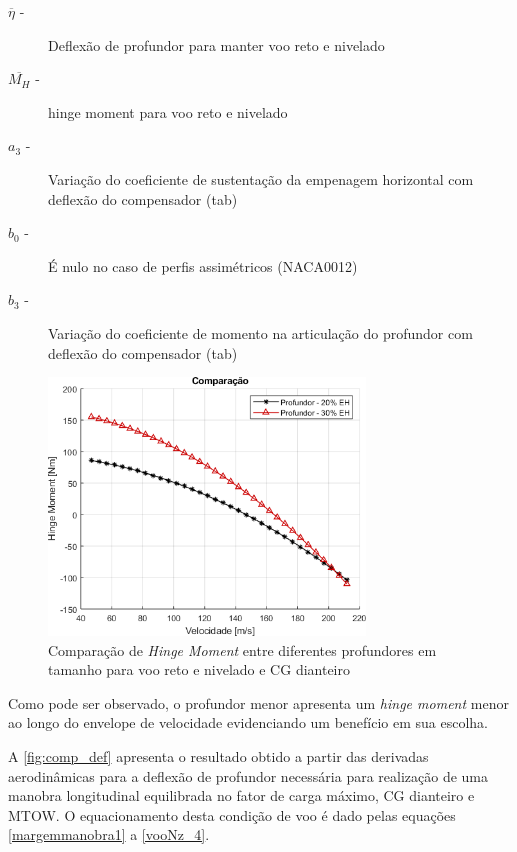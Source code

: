 \begin{description}
\item[$\overline{\eta}$ -] Deflexão de profundor para manter voo reto e nivelado
\item[$\overline{M_H}$ -] hinge moment para voo reto e nivelado
\item[$a_3$ -] Variação do coeficiente de sustentação da empenagem horizontal com deflexão do compensador (tab)
\item[$b_0$ -] É nulo no caso de perfis assimétricos (NACA0012)
\item[$b_3$ -] Variação do coeficiente de momento na articulação do profundor com deflexão do compensador (tab)
\end{description}

\begin{figure}[H]
\centering
\includegraphics[width=0.75\textwidth]{images/parte3/comparacao_hingemoment.png}
\caption[Comparação de \textit{Hinge Moment} entre diferentes profundores em tamanho]{Comparação de \textit{Hinge Moment} entre diferentes profundores em tamanho para voo reto e nivelado e CG dianteiro}
\label{fig:comp_hingemoment}
\end{figure}

Como pode ser observado, o profundor menor apresenta um \textit{hinge moment} menor ao longo do envelope de velocidade evidenciando um benefício em sua escolha.

A \autoref{fig:comp_def} apresenta o resultado obtido a partir das derivadas aerodinâmicas para a deflexão de profundor necessária para realização de uma manobra longitudinal equilibrada no fator de carga máximo, CG dianteiro e MTOW. O equacionamento desta condição de voo é dado pelas equações \ref{margemmanobra1} a \ref{vooNz_4}.

